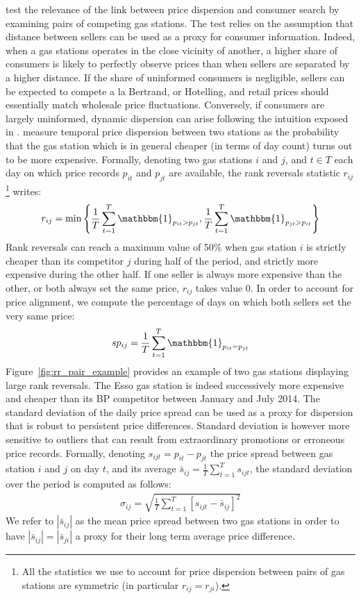 \documentclass[english]{article}
\begin{document}
\cite{TAP11} test the relevance of the link between price dispersion and consumer search by examining pairs of competing gas stations. The test relies on the assumption that distance between sellers can be used as a proxy for consumer information. Indeed, when a gas stations operates in the close vicinity of another, a higher share of consumers is likely to perfectly observe prices than when sellers are separated by a higher distance. If the share of uninformed consumers is negligible, sellers can be expected to compete a la Bertrand, or Hotelling, and retail prices should essentially match wholesale price fluctuations. Conversely, if consumers are largely uninformed, dynamic dispersion can arise following the intuition exposed in \cite{VAR80}. \cite{TAP11} measure temporal price dispersion between two stations as the probability that the gas station which is in general cheaper (in terms of day count) turns out to be more expensive. Formally, denoting two gas stations $i$ and $j$, and $t \in T$ each day on which price records $p_{it}$ and $p_{jt}$ are available, the rank reversals statistic $r_{ij}$%
\footnote{All the statistics we use to account for price dispersion between pairs of gas stations are symmetric (in particular $r_{ij} = r_{ji}$).}%
writes:
\begin{align*}
r_{ij} = \min\left\{\frac{1}{T} \sum_{t=1}^{T} \mathbbm{1}_{p_{it} > p_{jt}}, \frac{1}{T} \sum_{t=1}^{T} \mathbbm{1}_{p_{jt} > p_{it}}\right\}
\end{align*}
Rank reversals can reach a maximum value of 50\% when gas station $i$ is strictly cheaper than its competitor $j$ during half of the period, and strictly more expensive during the other half. If one seller is always more expensive than the other, or both always set the same price, $r_{ij}$ takes value 0. In order to account for price alignment, we compute the percentage of days on which both sellers set the very same price:
\begin{align*}
sp_{ij} = \frac{1}{T} \sum_{t=1}^{T} \mathbbm{1}_{p_{it} = p_{jt}}
\end{align*}
Figure~\ref{fig:rr_pair_example} provides an example of two gas stations displaying large rank reversals. The Esso gas station is indeed successively more expensive and cheaper than its BP competitor between January and July 2014. The standard deviation of the daily price spread can be used as a proxy for dispersion that is robust to persistent price differences. Standard deviation is however more sensitive to outliers that can result from extraordinary promotions or erroneous price records. Formally, denoting $s_{ijt} = p_{it} - p_{jt}$ the price spread between gas station $i$ and $j$ on day $t$, and its average $\bar{s}_{ij} = \frac{1}{T} \sum_{t=1}^{T} s_{ijt}$, the standard deviation over the period is computed as follows:
\begin{align*}
\sigma_{ij} = \sqrt{\frac{1}{T} \sum_{t=1}^{T} [s_{ijt} - \bar{s}_{ij}]^2}
\end{align*}
We refer to $|\bar{s}_{ij}|$ as the mean price spread between two gas stations in order to have $|\bar{s}_{ij}|=|\bar{s}_{ji}|$ a proxy for their long term average price difference.
\end{document}
